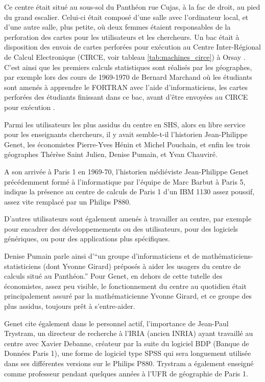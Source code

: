 Ce centre était situé au sous-sol du Panthéon rue Cujas, à la fac de droit, au pied du grand escalier. Celui-ci était composé d'une salle avec l'ordinateur local, et d'une autre salle, plus petite, où deux femmes étaient responsables de la perforation des cartes pour les utilisateurs et les chercheurs. Un bac était à disposition des envois de cartes perforées pour exécution au Centre Inter-Régional de Calcul Electronique (CIRCE, voir tableau \ref{tab:machines_circe}) à Orsay . C'est ainsi que les premiers calculs statistiques sont réalisés par les géographes, par exemple lors des cours de 1969-1970 de Bernard Marchand où les étudiants sont amenés à apprendre le FORTRAN avec l'aide d'informaticiens, les cartes perforées des étudiants finissant dans ce bac, avant d'être envoyées au CIRCE pour exécution \autocite[127]{Cuyala2014}.

Parmi les utilisateurs les plus assidus du centre en SHS, alors en libre service pour les enseignants chercheurs, il y avait semble-t-il l'historien Jean-Philippe Genet, les économistes Pierre-Yves Hénin et Michel Pouchain, et enfin les trois géographes Thérèse Saint Julien, Denise Pumain, et Yvan Chauviré.

A son arrivée à Paris 1 en 1969-70, l'historien médiéviste Jean-Philippe Genet précédemment formé à l'informatique par l'équipe de Marc Barbut à Paris 5, indique la présence au centre de calculs de Paris 1 d'un IBM 1130 assez poussif, assez vite remplacé par un Philips P880.

D'autres utilisateurs sont également amenés à travailler au centre, par exemple pour encadrer des développemements ou des utilisateurs, pour des logiciels génériques, ou pour des applications plus spécifiques.

Denise Pumain parle ainsi d'\enquote{un groupe d'informaticiens et de mathématiciens-statisticiens (dont Yvonne Girard) préposés à aider les usagers du centre de calculs situé au Panthéon.} Pour Genet, en dehors de cette tutelle des économistes, assez peu visible, le fonctionnement du centre au quotidien était principalement assuré par la mathématicienne Yvonne Girard, et ce groupe des plus assidus, toujours prêt à s'entre-aider.

Genet cite également dans le personnel actif, l'importance de Jean-Paul Trystram, un directeur de recherche à l'IRIA (ancien INRIA) ayant travaillé au centre avec Xavier Debanne, créateur par la suite du logiciel BDP (Banque de Données Paris 1), une forme de logiciel type SPSS qui sera longuement utilisée dans ses différentes versions sur le Philips P880. Trystram a également enseigné comme professeur pendant quelques années à l'UFR de géographie de Paris 1.

